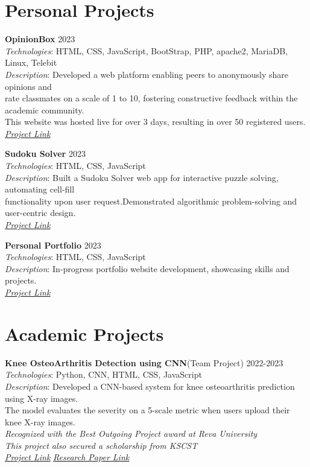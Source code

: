 \documentclass[a4paper,8pt]{article}
\begin{document}
\section*{Personal Projects}
\textbf{OpinionBox} \hfill 2023\\
\textit{Technologies}: HTML, CSS, JavaScript, BootStrap, PHP, apache2, MariaDB, Linux, Telebit \\
\textit{Description}: Developed a web platform enabling peers to anonymously share opinions and \\
rate classmates on a scale of 1 to 10, fostering constructive feedback within the academic community.\\
This website was hosted live for over 3 days, resulting in over 50 registered users.\\
\textit{\href{https://github.com/yashasc2k1/OpinionBox}{\underline{Project Link}}}

\textbf{Sudoku Solver} \hfill 2023\\
\textit{Technologies}: HTML, CSS, JavaScript \\
\textit{Description}: Built a Sudoku Solver web app for interactive puzzle solving, automating cell-fill \\
functionality upon user request.Demonstrated algorithmic problem-solving and user-centric design. \\
\textit{\href{https://yashasc2k1.github.io/SudokuSolver}{\underline{Project Link}}}

\textbf{Personal Portfolio} \hfill 2023\\
\textit{Technologies}: HTML, CSS, JavaScript \\
\textit{Description}: In-progress portfolio website development, showcasing skills and projects.\\
\textit{\href{https://yashasc2k1.github.io/YashasChandrashekar/}{\underline{Project Link}}}



\section*{Academic Projects}
\textbf{Knee OsteoArthritis Detection using CNN}(Team Project) \hfill 2022-2023\\
\textit{Technologies}: Python, CNN, HTML, CSS, JavaScript \\
\textit{Description}: Developed a CNN-based system for knee osteoarthritis prediction using X-ray images. \\
The model evaluates the severity on a 5-scale metric when users upload their knee X-ray images. \\
\textit{Recognized with the Best Outgoing Project award at Reva University} \\
\textit{This project also secured a scholarship from KSCST}\\
\textit{\href{https://github.com/yashasc2k1/KneeOsteoArthritis}{\underline{Project Link}}}       \textit{\href{https://www.ijraset.com/research-paper/knee-osteoarthritis-detection-and-severity-prediction}{\underline{Research Paper Link}}}
\end{document}
